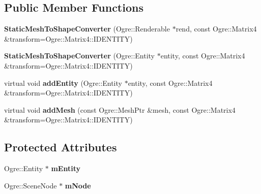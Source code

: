 \subsection*{Public Member Functions}
\begin{DoxyCompactItemize}
\item 
\hypertarget{class_ogre_bullet_collisions_1_1_static_mesh_to_shape_converter_a7575a81e2797d6e85119388011d1e26b}{{\bfseries Static\-Mesh\-To\-Shape\-Converter} (Ogre\-::\-Renderable $\ast$rend, const Ogre\-::\-Matrix4 \&transform=Ogre\-::\-Matrix4\-::\-I\-D\-E\-N\-T\-I\-T\-Y)}\label{class_ogre_bullet_collisions_1_1_static_mesh_to_shape_converter_a7575a81e2797d6e85119388011d1e26b}

\item 
\hypertarget{class_ogre_bullet_collisions_1_1_static_mesh_to_shape_converter_a235788ac29af92feb6f162191bf17a82}{{\bfseries Static\-Mesh\-To\-Shape\-Converter} (Ogre\-::\-Entity $\ast$entity, const Ogre\-::\-Matrix4 \&transform=Ogre\-::\-Matrix4\-::\-I\-D\-E\-N\-T\-I\-T\-Y)}\label{class_ogre_bullet_collisions_1_1_static_mesh_to_shape_converter_a235788ac29af92feb6f162191bf17a82}

\item 
\hypertarget{class_ogre_bullet_collisions_1_1_static_mesh_to_shape_converter_ae6cc0c55908320e5ed3d1bd54bc1c22f}{virtual void {\bfseries add\-Entity} (Ogre\-::\-Entity $\ast$entity, const Ogre\-::\-Matrix4 \&transform=Ogre\-::\-Matrix4\-::\-I\-D\-E\-N\-T\-I\-T\-Y)}\label{class_ogre_bullet_collisions_1_1_static_mesh_to_shape_converter_ae6cc0c55908320e5ed3d1bd54bc1c22f}

\item 
\hypertarget{class_ogre_bullet_collisions_1_1_static_mesh_to_shape_converter_a93facb31886ca838c6d7a081bbeddb91}{virtual void {\bfseries add\-Mesh} (const Ogre\-::\-Mesh\-Ptr \&mesh, const Ogre\-::\-Matrix4 \&transform=Ogre\-::\-Matrix4\-::\-I\-D\-E\-N\-T\-I\-T\-Y)}\label{class_ogre_bullet_collisions_1_1_static_mesh_to_shape_converter_a93facb31886ca838c6d7a081bbeddb91}

\end{DoxyCompactItemize}
\subsection*{Protected Attributes}
\begin{DoxyCompactItemize}
\item 
\hypertarget{class_ogre_bullet_collisions_1_1_static_mesh_to_shape_converter_ac4b7cec8cfc349f9f02b4bc031147e08}{Ogre\-::\-Entity $\ast$ {\bfseries m\-Entity}}\label{class_ogre_bullet_collisions_1_1_static_mesh_to_shape_converter_ac4b7cec8cfc349f9f02b4bc031147e08}

\item 
\hypertarget{class_ogre_bullet_collisions_1_1_static_mesh_to_shape_converter_aaf9ad75f5c3b01f2ac11d425229ceab5}{Ogre\-::\-Scene\-Node $\ast$ {\bfseries m\-Node}}\label{class_ogre_bullet_collisions_1_1_static_mesh_to_shape_converter_aaf9ad75f5c3b01f2ac11d425229ceab5}

\end{DoxyCompactItemize}
